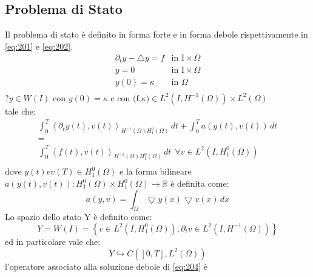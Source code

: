 \subsection{Problema di Stato}
Il problema di stato è definito in forma forte e in forma debole rispettivamente in \eqref{eq:201} e \eqref{eq:202}.
\begin{equation}
\begin{array}{cc}
 	{\partial_{t}}y - {\bigtriangleup}y = f & \text{in I}\times\Omega \\
	y=0 & \text{in I}\times\Omega \\
	y(0) = \kappa & \text{in }\Omega \\
\end{array}
\label{eq:201}
\end{equation}
$\text{?} y \in W(I) \text{ con } y(0)=\kappa \text{ e } \text{con (f,}\kappa) \in L^2(I,{H^{-1}(\Omega)})\times {L^{2}(\Omega)}$ \\
tale che:
\begin{equation}
\begin{array}{c}
	\int_{0}^{T} \left \langle {\partial_{t}}y(t),v(t) \right \rangle_{{H^{-1}(\Omega)}{H^{0}_{1}(\Omega)}} \, dt +  	\int_{0}^{T} a(y(t),v(t)) \, dt  \\
	 = \\
	\int_{0}^{T} \left \langle f(t),v(t) \right \rangle_{{H^{-1}(\Omega)}{H^{0}_{1}(\Omega)}} \, dt \ \ \forall v \in L^2(I,{H^{0}_{1}(\Omega)}) \\
\end{array}
\label{eq:202}
\end{equation}
dove $y(t) e v(T) \in {H^{0}_{1}(\Omega)}$ e la forma bilineare $a(y(t),v(t)): {H^{0}_{1}(\Omega)}{\times}{H^{0}_{1}(\Omega)}\rightarrow\mathbb{R}$ è definita come:
\begin{equation}
 a(y,v) = \int_{\Omega} {\bigtriangledown}y(x){\bigtriangledown}v(x) \, dx
\label{eq:203}
\end{equation}
Lo spazio dello stato Y è definito come:
\begin{equation}
Y = W(I) =  \left\{ v \in L^2(I, {H^{0}_{1}(\Omega)}), {{\partial}_{t}}v \in L^2(I, {H^{-1}(\Omega)}) \right\}
\label{eq:204}
\end{equation}
ed in particolare vale che:
\begin{equation}
Y \hookrightarrow C(\left[0,T\right], {L^{2}(\Omega)})
\label{eq:205}
\end{equation}
l'operatore associato alla soluzione debole di \ref{eq:204} è  

